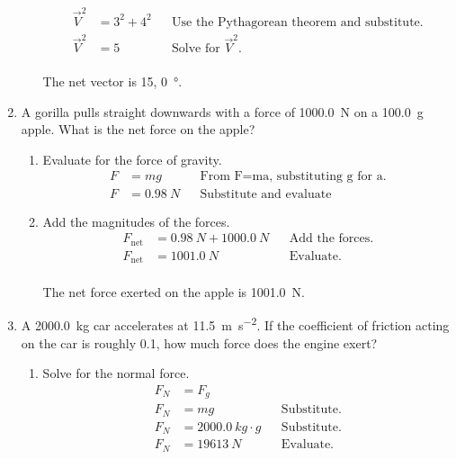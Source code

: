 \documentclass[letterpaper, 12pt]{report}
\begin{document}
\begin{enumerate}
\begin{enumerate}
\begin{align}
            \vec{V}^2 &= 3^2 + 4^2 && \text{Use the Pythagorean theorem and substitute.} \\
            \vec{V}^2 &= 5 && \text{Solve for } \vec{V}^2 \text{.}
        \end{align}
        \\
        The net vector is 15, \SI{0}{\degree}.
        \\
    \end{enumerate}
    \item A gorilla pulls straight downwards with a force of \SI{1000.0}{N} on a \SI{100.0}{g} apple. What is the net force on the apple?
    \begin{enumerate}
        \item Evaluate for the force of gravity.
            \begin{align}
                F &= mg && \text{From F=ma, substituting g for a.} \\
                F &= \SI{0.98}{N} && \text{Substitute and evaluate}
            \end{align}
        \item Add the magnitudes of the forces.
            \begin{align}
                F_{\text{net}} &= \SI{0.98}{N} + \SI{1000.0}{N} && \text{Add the forces.} \\
                F_{\text{net}} &= \SI{1001.0}{N} && \text{Evaluate.}
            \end{align}
        \hfill
        \\
        The net force exerted on the apple is \SI{1001.0}{N}.
        \\    
    \end{enumerate}
    \item A \SI{2000.0}{kg} car accelerates at \SI{11.5}{\meter\per\second\squared}. If the coefficient of friction acting on the car is roughly 0.1, how much force does the engine exert?
            \begin{enumerate}
                \item Solve for the normal force.
                    \begin{align}
                        F_N &= F_g && \\
                        F_N &= mg && \text{Substitute.} \\
                        F_N &= \SI{2000.0}{kg} \cdot g && \text{Substitute.} \\ 
                        F_N &= \SI{19613}{N} && \text{Evaluate.}
                    \end{align}

\end{enumerate}
\end{enumerate}
\end{document}
